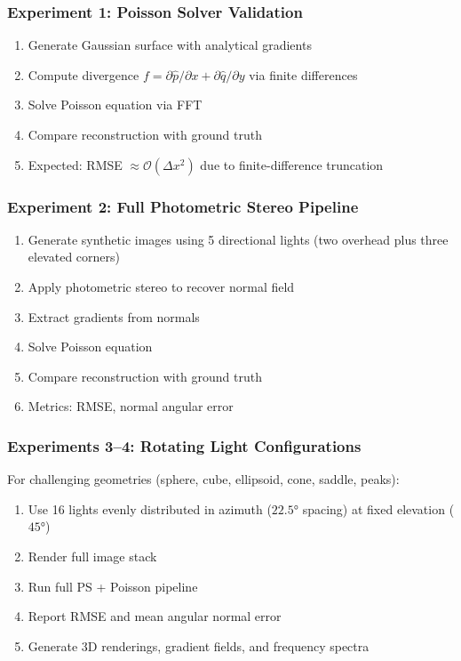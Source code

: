\documentclass[11pt]{article}
\begin{document}
\subsubsection{Experiment 1: Poisson Solver Validation}

\begin{enumerate}
\item Generate Gaussian surface with analytical gradients
\item Compute divergence $f = \partial \hat{p}/\partial x + \partial \hat{q}/\partial y$ via finite differences
\item Solve Poisson equation via FFT
\item Compare reconstruction with ground truth
\item Expected: RMSE $\approx \mathcal{O}(\Delta x^2)$ due to finite-difference truncation
\end{enumerate}

\subsubsection{Experiment 2: Full Photometric Stereo Pipeline}

\begin{enumerate}
\item Generate synthetic images using 5 directional lights (two overhead plus three elevated corners)
\item Apply photometric stereo to recover normal field
\item Extract gradients from normals
\item Solve Poisson equation
\item Compare reconstruction with ground truth
\item Metrics: RMSE, normal angular error
\end{enumerate}

\subsubsection{Experiments 3--4: Rotating Light Configurations}

For challenging geometries (sphere, cube, ellipsoid, cone, saddle, peaks):
\begin{enumerate}
\item Use 16 lights evenly distributed in azimuth ($22.5°$ spacing) at fixed elevation ($45°$)
\item Render full image stack
\item Run full PS + Poisson pipeline
\item Report RMSE and mean angular normal error
\item Generate 3D renderings, gradient fields, and frequency spectra
\end{enumerate}
\end{document}

